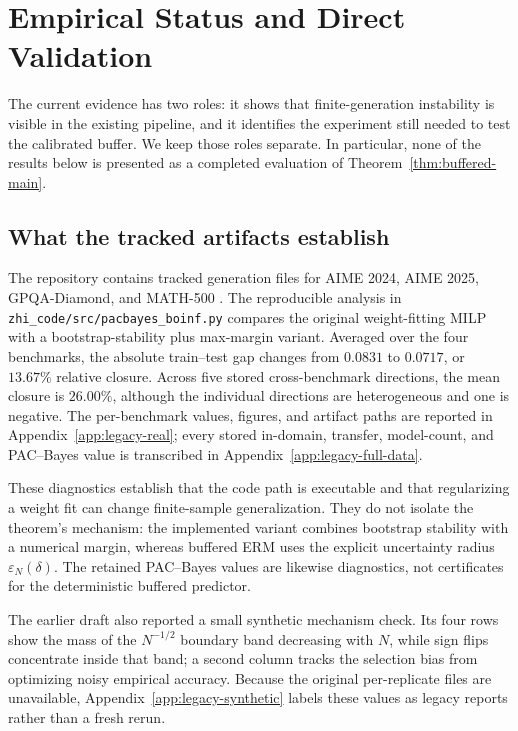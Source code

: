 \section{Empirical Status and Direct Validation}
\label{sec:experiments}

The current evidence has two roles: it shows that finite-generation
instability is visible in the existing pipeline, and it identifies the
experiment still needed to test the calibrated buffer.  We keep those roles
separate.  In particular, none of the results below is presented as a completed
evaluation of Theorem~\ref{thm:buffered-main}.

\subsection{What the tracked artifacts establish}
\label{sec:experiments-existing}

The repository contains tracked generation files for AIME 2024, AIME 2025,
GPQA-Diamond, and MATH-500 \citep{rein2023gpqaag,hendrycks2021measuringmp}.
The reproducible analysis in
\texttt{zhi\_code/src/pacbayes\_boinf.py} compares the original weight-fitting
MILP with a bootstrap-stability plus max-margin variant.  Averaged over the four
benchmarks, the absolute train--test gap changes from \(0.0831\) to \(0.0717\),
or \(13.67\%\) relative closure.  Across five stored cross-benchmark
directions, the mean closure is \(26.00\%\), although the individual directions
are heterogeneous and one is negative.  The per-benchmark values, figures, and
artifact paths are reported in Appendix~\ref{app:legacy-real}; every stored
in-domain, transfer, model-count, and PAC--Bayes value is transcribed in
Appendix~\ref{app:legacy-full-data}.

These diagnostics establish that the code path is executable and that
regularizing a weight fit can change finite-sample generalization.  They do not
isolate the theorem's mechanism: the implemented variant combines bootstrap
stability with a numerical margin, whereas buffered ERM uses the explicit
uncertainty radius \(\varepsilon_N(\delta)\).  The retained PAC--Bayes values
are likewise diagnostics, not certificates for the deterministic buffered
predictor.

The earlier draft also reported a small synthetic mechanism check.  Its four
rows show the mass of the \(N^{-1/2}\) boundary band decreasing with \(N\),
while sign flips concentrate inside that band; a second column tracks the
selection bias from optimizing noisy empirical accuracy.  Because the original
per-replicate files are unavailable, Appendix~\ref{app:legacy-synthetic}
labels these values as legacy reports rather than a fresh rerun.

